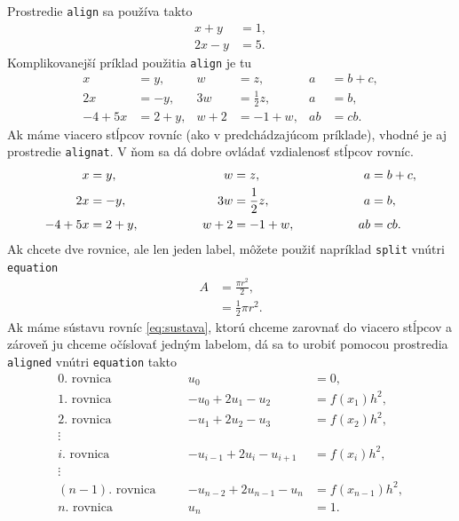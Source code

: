 Prostredie \verb|align| sa používa takto
\begin{align}
	x + y  & = 1, \label{eq:align1} \\
	2x - y & = 5. \label{eq:align2}
\end{align}
Komplikovanejší príklad použitia \verb|align| je tu
\begin{align*}
	x&=y,           &  w &=z,              &  a&=b+c,\\
	2x&=-y,         &  3w&=\frac{1}{2}z,   &  a&=b,\\
	-4 + 5x&=2+y,   &  w+2&=-1+w,          &  ab&=cb.
\end{align*}
Ak máme viacero stĺpcov rovníc (ako v predchádzajúcom príklade), vhodné je aj prostredie \verb|alignat|. V ňom sa dá dobre ovládať vzdialenosť stĺpcov rovníc.
\begin{alignat*}{3}
	x       & =y,   & \hspace{1.5cm}  w  & =z,            & \hspace{1.5cm} a & =b+c, \\
	2x      & =-y,  & \hspace{1.5cm} 3w  & =\frac{1}{2}z, & \hspace{1.5cm}a  & =b,   \\
	-4 + 5x & =2+y, & \hspace{1.5cm} w+2 & =-1+w,         & \hspace{1.5cm}ab & =cb.
\end{alignat*}
Ak chcete dve rovnice, ale len jeden label, môžete použiť napríklad \verb|split| vnútri \verb|equation|
\begin{equation} \label{eq:equation_split}
	\begin{split}
		A & = \frac{\pi r^2}{2}, \\
		& = \frac{1}{2} \pi r^2.
	\end{split}
\end{equation}
Ak máme sústavu rovníc \eqref{eq:sustava}, ktorú chceme zarovnať do viacero stĺpcov a zároveň ju chceme očíslovať jedným labelom, dá sa to urobiť pomocou prostredia \verb|aligned| vnútri \verb|equation| takto
\begin{equation}\label{eq:sustava}
	\begin{aligned}
		0. \mbox{ rovnica}     & \quad & u_0                   & =0,             \\
		1. \mbox{ rovnica}     & \quad & -u_0+2u_1-u_2         & =f(x_1)h^2,     \\
		2. \mbox{ rovnica}     & \quad & -u_1+2u_2-u_3         & =f(x_2)h^2,     \\
		\vdots                 &  \\
		i. \mbox{ rovnica}     & \quad & -u_{i-1}+2u_i-u_{i+1} & =f(x_i)h^2,     \\
		\vdots                 &  \\
		(n-1). \mbox{ rovnica} & \quad & -u_{n-2}+2u_{n-1}-u_n & =f(x_{n-1})h^2, \\
		n. \mbox{ rovnica}     & \quad & u_n                   & =1.
	\end{aligned}
\end{equation}
